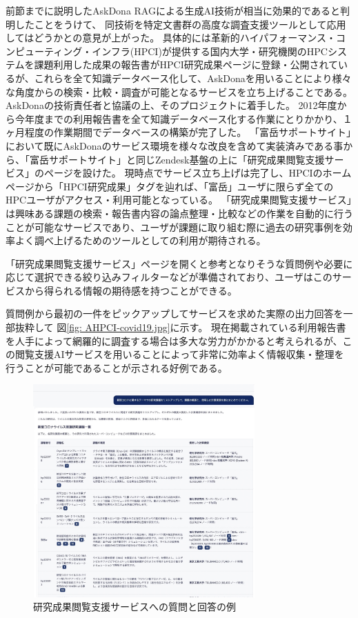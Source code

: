 \documentclass{jsaxiesproc}
\begin{document}
前節までに説明したAskDona RAGによる生成AI技術が相当に効果的であると判明したことをうけて、
同技術を特定文書群の高度な調査支援ツールとして応用してはどうかとの意見が上がった。
具体的には革新的ハイパフォーマンス・コンピューティング・インフラ(HPCI)が提供する国内大学・研究機関のHPCシステムを課題利用した成果の報告書がHPCI研究成果ページに登録・公開されているが、これらを全て知識データベース化して、AskDonaを用いることにより様々な角度からの検索・比較・調査が可能となるサービスを立ち上げることである。
AskDonaの技術責任者と協議の上、そのプロジェクトに着手した。
2012年度から今年度までの利用報告書を全て知識データベース化する作業にとりかかり、１ヶ月程度の作業期間でデータベースの構築が完了した。
「富岳サポートサイト」において既にAskDonaのサービス環境を様々な改良を含めて実装済みである事から、「富岳サポートサイト」と同じZendesk基盤の上に「研究成果閲覧支援サービス」のページを設けた。
現時点でサービス立ち上げは完了し、HPCIのホームページから「HPCI研究成果」タグを辿れば、「富岳」ユーザに限らず全てのHPCユーザがアクセス・利用可能となっている。
「研究成果閲覧支援サービス」は興味ある課題の検索・報告書内容の論点整理・比較などの作業を自動的に行うことが可能なサービスであり、ユーザが課題に取り組む際に過去の研究事例を効率よく調べ上げるためのツールとしての利用が期待される。

「研究成果閲覧支援サービス」ページを開くと参考となりそうな質問例や必要に応じて選択できる絞り込みフィルターなどが準備されており、ユーザはこのサービスから得られる情報の期待感を持つことができる。

質問例から最初の一件をピックアップしてサービスを求めた実際の出力回答を一部抜粋して
図\ref{fig: AHPCI-covid19.jpg}に示す。
現在掲載されている利用報告書を人手によって網羅的に調査する場合は多大な労力がかかると考えられるが、この閲覧支援AIサービスを用いることによって非常に効率よく情報収集・整理を行うことが可能であることが示される好例である。

\begin{figure}[htbp]
\includegraphics[width=8.5cm]{figs/HPCI-covid19.jpg}
\caption{研究成果閲覧支援サービスへの質問と回答の例}
\label{fig:AHPCI-covid19.jpg}
\end{figure}
\end{document}
